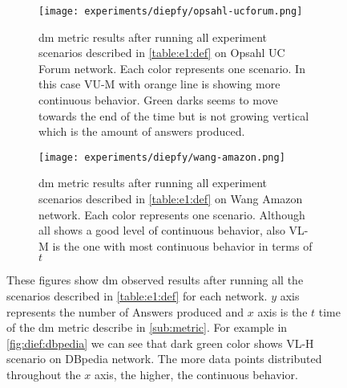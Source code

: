 \begin{figure}[!htp]
  \begin{subfigure}[t]{0.45\textwidth}
   \texttt{[image: experiments/diepfy/opsahl-ucforum.png]}
    \caption[{[EE] \acrshort{dm} Results: Opsahl UC Forum}]{\acrshort{dm} metric results after running all experiment scenarios described in \autoref{table:e1:def} on Opsahl UC Forum network. Each color represents one scenario. In this case VU-M with orange line is showing more continuous behavior. Green darks seems to move towards the end of the time but is not growing vertical which is the amount of answers produced.}
    \label{fig:dief:opsahl}
  \end{subfigure}\hfill
  \begin{subfigure}[t]{0.45\textwidth}
    \texttt{[image: experiments/diepfy/wang-amazon.png]}
     \caption[{[EE] \acrshort{dm} Results: Wang Amazon}]{\acrshort{dm} metric results after running all experiment scenarios described in \autoref{table:e1:def} on Wang Amazon network. Each color represents one scenario. Although all shows a good level of continuous behavior, also VL-M is the one with most continuous behavior in terms of $t$}
     \label{fig:dief:wang}
   \end{subfigure}
   \caption[{[EE] \acrshort{dm} General Results}]{These figures show \acrshort{dm} observed results after running all the scenarios described in \autoref{table:e1:def} for each network. $y$ axis represents the number of Answers produced and $x$ axis is the $t$ time of the \acrshort{dm} metric describe in \autoref{sub:metric}. For example in \autoref{fig:dief:dbpedia} we can see that dark green color shows VL-H scenario on DBpedia network. The more data points distributed throughout the $x$ axis, the higher, the continuous behavior.}
   \label{fig:dief:all}
 \end{figure}


